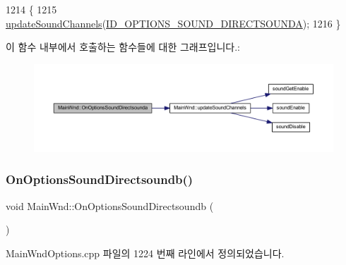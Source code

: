 \begin{DoxyCode}
1214 \{
1215   \mbox{\hyperlink{class_main_wnd_a30b67d9db53d79122684a81e549ebd1c}{updateSoundChannels}}(\mbox{\hyperlink{resource_8h_a95000ddb4524a3566c234b09a7c9b825}{ID\_OPTIONS\_SOUND\_DIRECTSOUNDA}});
1216 \}
\end{DoxyCode}
이 함수 내부에서 호출하는 함수들에 대한 그래프입니다.\+:
\nopagebreak
\begin{figure}[H]
\begin{center}
\leavevmode
\includegraphics[width=350pt]{class_main_wnd_adf862907e5764ee38c51cdd192dc5bae_cgraph}
\end{center}
\end{figure}
\mbox{\label{class_main_wnd_a19e333bd762c2497d3ff416d21c3c0c0}} 
\subsubsection{\texorpdfstring{On\+Options\+Sound\+Directsoundb()}{OnOptionsSoundDirectsoundb()}}
{\footnotesize\ttfamily void Main\+Wnd\+::\+On\+Options\+Sound\+Directsoundb (\begin{DoxyParamCaption}{ }\end{DoxyParamCaption})\hspace{0.3cm}{\ttfamily [protected]}}



Main\+Wnd\+Options.\+cpp 파일의 1224 번째 라인에서 정의되었습니다.


